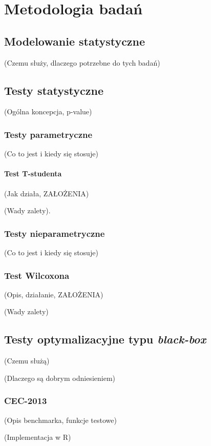 \documentclass[12pt,a4paper]{report}
\begin{document}
{{{\chapter{Metodologia badań}
\section{Modelowanie statystyczne}
\par{
(Czemu służy, dlaczego potrzebne do tych badań)
}
\section{Testy statystyczne}
\par{
(Ogólna koncepcja, p-value)
}
\subsection{Testy parametryczne}
\par{
(Co to jest i kiedy się stosuje)
}
\subsubsection{Test T-studenta}
\par{
(Jak działa, ZAŁOŻENIA)
}
\par{
(Wady zalety).
}

\subsection{Testy nieparametryczne}
\par{
(Co to jest i kiedy się stosuje)
}
\subsection{Test Wilcoxona}
\par{
(Opis, działanie, ZAŁOŻENIA)
}
\par{
(Wady zalety)
}
\section{Testy optymalizacyjne typu \emph{black-box}}
\par{
(Czemu służą)
}
\par{
(Dlaczego są dobrym odniesieniem)
}

\subsection{CEC-2013}
\label{CEC2013chapter}
\par{
(Opis benchmarka, funkcje testowe)
}
\par{
(Implementacja w R)
}
}}}
\end{document}
